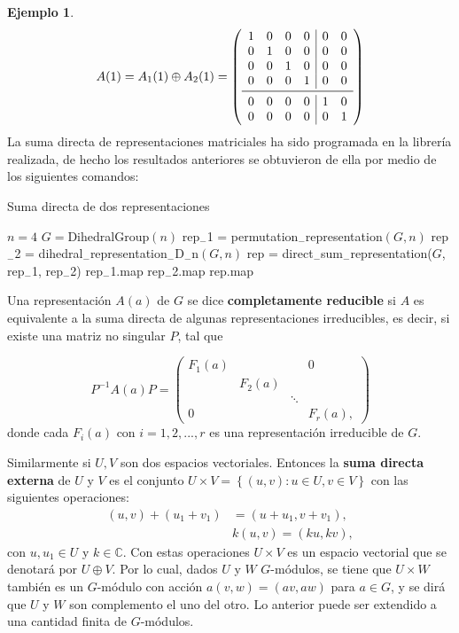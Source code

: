 \documentclass[12pt]{book}
\theoremstyle{definition}
\newtheorem{example}[theorem]{Ejemplo}
\newcounter{in}
\newcounter{ini}
\begin{document}
\begin{example}
\[
A(1) = A_{1}(1) \oplus A_{2}(1) =
\left( \begin{array}{cccc|cc}
1 & 0 & 0 & 0 & 0 & 0 \\
0 & 1 & 0 & 0 & 0 & 0 \\
0 & 0 & 1 & 0 & 0 & 0 \\
0 & 0 & 0 & 1 & 0 & 0 \\
\midrule
0 & 0 & 0 & 0 & 1 & 0 \\
0 & 0 & 0 & 0 & 0 & 1 \\
\end{array}\right)
\]
La suma directa de representaciones matriciales ha sido programada en la librería realizada, de hecho los resultados anteriores se obtuvieron de ella por medio de los siguientes comandos:
\begin{algorithm}[H]
\caption{Suma directa de dos representaciones}
\begin{algorithmic}
\REQUIRE $n = 4$
\REQUIRE $G = $DihedralGroup$(n)$
\STATE rep$_{-}$1 = permutation$_{-}$representation$(G, n)$
\STATE rep$_{-}$2 = dihedral$_{-}$representation$_{-}$D$_{-}$n$(G,n)$
\STATE rep = direct$_{-}$sum$_{-}$representation($G$, rep$_{-}$1, rep$_{-}$2)
\PRINT rep$_{-}$1.map
\PRINT rep$_{-}$2.map
\PRINT rep.map
\end{algorithmic}
\end{algorithm}
\end{example}
Una representación $A\left(a\right)$ de $G$ se dice \textbf{completamente
reducible} si $A$ es equivalente a la suma directa de algunas
representaciones irreducibles, es decir, si existe una matriz no singular
$P$, tal que

\begin{equation*}
 P^{-1}A\left(a\right)P=
 \begin{pmatrix}
   F_{1}(a) & & & 0\\
   & F_{2}(a) & & \\
   & & \ddots & \\
   0 & & & F_{r}(a),
 \end{pmatrix}
\end{equation*}
donde cada $F_{i}\left(a\right)$ con $i=1,2,...,r$ es una
representación irreducible de $G$.

\begin{mdframed}
  Similarmente si $U,V$ son dos espacios vectoriales. Entonces la
  \textbf{suma directa externa} de $U$ y $V$ es el conjunto
  $U \times V = \left \{ (u,v) \colon u \in U, v \in V \right \}$ con
  las siguientes operaciones:
  \begin{equation}
    \label{eq:94}
    \begin{split}
(u,v)+(u_1+v_1) & = (u+u_1,v+v_1), \\
 & k(u,v) = (ku,kv),
\end{split}
  \end{equation}
  con $u, u_1 \in U$ y $k \in \mathbb{C}$. Con estas operaciones
  $U \times V$ es un espacio vectorial que se denotará por
  $U \oplus V$.  Por lo cual, dados $U$ y $W$ $G$-módulos, se tiene
  que $U \times W$ también es un $G$-módulo con acción
  $a(v,w) = (av,aw)$ para $a \in G$, y se dirá que $U$ y $W$ son complemento el uno del otro. Lo anterior puede ser extendido a
  una cantidad finita de $G$-módulos.
\end{mdframed}
\end{document}
